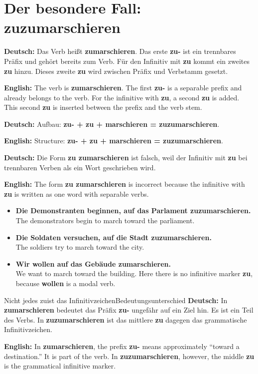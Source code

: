 \documentclass[a4paper,11pt]{article}
\newcommand{\GermanText}[1]{\textbf{Deutsch: }#1\par}
\newcommand{\EnglishText}[1]{{\small\color{SoftGray}\textbf{English: }#1\par}}
\newcommand{\ExampleItem}[2]{\item \textbf{#1}\\{\small\color{SoftGray}#2}}
\begin{document}
    \section{Der besondere Fall: \glqq zuzumarschieren\grqq}

        \begin{warningbox}
            \GermanText{Das Verb heißt \textbf{zumarschieren}. Das erste \textbf{zu-} ist ein trennbares Präfix und gehört bereits zum Verb. Für den Infinitiv mit \textbf{zu} kommt ein zweites \textbf{zu} hinzu. Dieses zweite \textbf{zu} wird zwischen Präfix und Verbstamm gesetzt.}
            \EnglishText{The verb is \textbf{zumarschieren}. The first \textbf{zu-} is a separable prefix and already belongs to the verb. For the infinitive with \textbf{zu}, a second \textbf{zu} is added. This second \textbf{zu} is inserted between the prefix and the verb stem.}

            \GermanText{Aufbau: \textbf{zu- + zu + marschieren = zuzumarschieren}.}
            \EnglishText{Structure: \textbf{zu- + zu + marschieren = zuzumarschieren}.}

            \GermanText{Die Form \textbf{zu zumarschieren} ist falsch, weil der Infinitiv mit \textbf{zu} bei trennbaren Verben als ein Wort geschrieben wird.}
            \EnglishText{The form \textbf{zu zumarschieren} is incorrect because the infinitive with \textbf{zu} is written as one word with separable verbs.}
        \end{warningbox}

        \begin{exbox}
            \begin{itemize}
                \ExampleItem{Die Demonstranten beginnen, auf das Parlament zuzumarschieren.}{The demonstrators begin to march toward the parliament.}
                \ExampleItem{Die Soldaten versuchen, auf die Stadt zuzumarschieren.}{The soldiers try to march toward the city.}
                \ExampleItem{Wir wollen auf das Gebäude zumarschieren.}{We want to march toward the building. Here there is no infinitive marker \textbf{zu}, because \textbf{wollen} is a modal verb.}
            \end{itemize}
        \end{exbox}

        \begin{grammarentry}{Nicht jedes \glqq zu\grqq ist das Infinitivzeichen}{Bedeutungsunterschied}
            \GermanText{In \textbf{zumarschieren} bedeutet das Präfix \textbf{zu-} ungefähr \glqq auf ein Ziel hin\grqq. Es ist ein Teil des Verbs. In \textbf{zuzumarschieren} ist das mittlere \textbf{zu} dagegen das grammatische Infinitivzeichen.}
            \EnglishText{In \textbf{zumarschieren}, the prefix \textbf{zu-} means approximately ``toward a destination.'' It is part of the verb. In \textbf{zuzumarschieren}, however, the middle \textbf{zu} is the grammatical infinitive marker.}
        \end{grammarentry}
\end{document}
